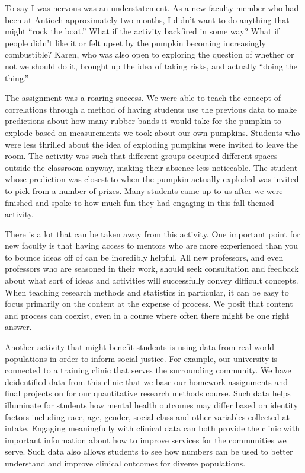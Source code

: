 \documentclass[
  11pt,
]{book}
\begin{document}
To say I was nervous was an understatement. As a new faculty member who had been at Antioch approximately two months, I didn't want to do anything that might ``rock the boat.'' What if the activity backfired in some way? What if people didn't like it or felt upset by the pumpkin becoming increasingly combustible? Karen, who was also open to exploring the question of whether or not we should do it, brought up the idea of taking risks, and actually ``doing the thing.''

The assignment was a roaring success. We were able to teach the concept of correlations through a method of having students use the previous data to make predictions about how many rubber bands it would take for the pumpkin to explode based on measurements we took about our own pumpkins. Students who were less thrilled about the idea of exploding pumpkins were invited to leave the room. The activity was such that different groups occupied different spaces outside the classroom anyway, making their absence less noticeable. The student whose prediction was closest to when the pumpkin actually exploded was invited to pick from a number of prizes. Many students came up to us after we were finished and spoke to how much fun they had engaging in this fall themed activity.

There is a lot that can be taken away from this activity. One important point for new faculty is that having access to mentors who are more experienced than you to bounce ideas off of can be incredibly helpful. All new professors, and even professors who are seasoned in their work, should seek consultation and feedback about what sort of ideas and activities will successfully convey difficult concepts. When teaching research methods and statistics in particular, it can be easy to focus primarily on the content at the expense of process. We posit that content and process can coexist, even in a course where often there might be one right answer.

Another activity that might benefit students is using data from real world populations in order to inform social justice. For example, our university is connected to a training clinic that serves the surrounding community. We have deidentified data from this clinic that we base our homework assignments and final projects on for our quantitative research methods course. Such data helps illuminate for students how mental health outcomes may differ based on identity factors including race, age, gender, social class and other variables collected at intake. Engaging meaningfully with clinical data can both provide the clinic with important information about how to improve services for the communities we serve. Such data also allows students to see how numbers can be used to better understand and improve clinical outcomes for diverse populations.
\end{document}
